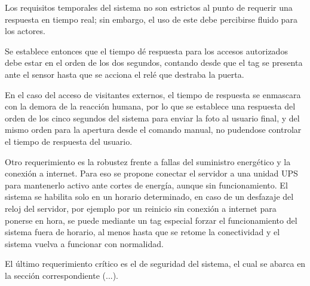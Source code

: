 Los requisitos temporales del sistema no son estrictos al punto de requerir una respuesta en tiempo real; sin embargo, el uso de este debe percibirse fluido para los actores.

Se establece entonces que el tiempo dé respuesta para los accesos autorizados debe estar en el orden de los dos segundos, contando desde que el tag se presenta ante el sensor hasta que se acciona el relé que destraba la puerta. 

En el caso del acceso de visitantes externos, el tiempo de respuesta se enmascara con la demora de la reacción humana, por lo que se establece una respuesta del orden de los cinco segundos del sistema para enviar la foto al usuario final, y del mismo orden para la apertura desde el comando manual, no pudendose controlar el tiempo de respuesta del usuario. 

Otro requerimiento es la robustez frente a fallas del suministro energético y la conexión a internet. Para eso se propone conectar el servidor a una unidad UPS para mantenerlo activo ante cortes de energía, aunque sin funcionamiento. El sistema se habilita solo en un horario determinado, en caso de un desfazaje del reloj del servidor, por ejemplo por un reinicio sin conexión a internet para ponerse en hora, se puede mediante un tag especial forzar el funcionamiento del sistema fuera de horario, al menos hasta que se retome la conectividad y el sistema vuelva a funcionar con normalidad.

El último requerimiento crítico es el de seguridad del sistema, el cual se abarca en la sección correspondiente (...).